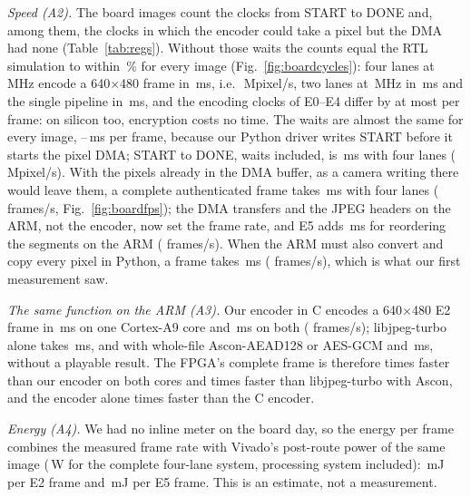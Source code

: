 \textit{Speed (A2).} The board images count the clocks from START to DONE and, among them, the clocks in which the encoder could take a pixel but the DMA had none (Table~\ref{tab:regs}). Without those waits the counts equal the RTL simulation to within \BdBusyVsRtlMaxPct\,\% for every image (Fig.~\ref{fig:boardcycles}): four lanes at \BdFourMhz\,MHz encode a 640$\times$480 frame in \BdFourBusyMs\,ms, i.e.\ \BdFourBusyMpix\,Mpixel/s, two lanes at \BdTwoMhz\,MHz in \BdTwoBusyMs\,ms and the single pipeline in \BdOneBusyMs\,ms, and the encoding clocks of E0--E4 differ by at most \BdFourBusySpreadClk{} per frame: on silicon too, encryption costs no time. The waits are almost the same for every image, \BdWaitMsMin--\BdWaitMsMax\,ms per frame, because our Python driver writes START before it starts the pixel DMA; START to DONE, waits included, is \BdFourFabricMs\,ms with four lanes (\BdFourFabricMpix\,Mpixel/s). With the pixels already in the DMA buffer, as a camera writing there would leave them, a complete authenticated frame takes \BdFourZcMs\,ms with four lanes (\BdFourZcFps{} frames/s, Fig.~\ref{fig:boardfps}); the DMA transfers and the JPEG headers on the ARM, not the encoder, now set the frame rate, and E5 adds \BdFourEfiveExtraMs\,ms for reordering the segments on the ARM (\BdFourEfiveZcFps{} frames/s). When the ARM must also convert and copy every pixel in Python, a frame takes \BdFourRtMs\,ms (\BdFourRtFps{} frames/s), which is what our first measurement saw.

\textit{The same function on the ARM (A3).} Our encoder in C encodes a 640$\times$480 E2 frame in \BdArmOursOneMs\,ms on one Cortex-A9 core and \BdArmOursTwoMs\,ms on both (\BdArmOursTwoFps{} frames/s); libjpeg-turbo alone takes \BdArmTurboMs\,ms, and with whole-file Ascon-AEAD128 or AES-GCM \BdArmTurboAsconMs{} and \BdArmTurboAesMs\,ms, without a playable result. The FPGA's complete frame is therefore \BdSpeedupFrame{} times faster than our encoder on both cores and \BdSpeedupTurboAscon{} times faster than libjpeg-turbo with Ascon, and the encoder alone \BdSpeedupFabric{} times faster than the C encoder.

\textit{Energy (A4).} We had no inline meter on the board day, so the energy per frame combines the measured frame rate with Vivado's post-route power of the same image (\BdPowerEstW\,W for the complete four-lane system, processing system included): \BdEnergyEtwoMj\,mJ per E2 frame and \BdEnergyEfiveMj\,mJ per E5 frame. This is an estimate, not a measurement.

